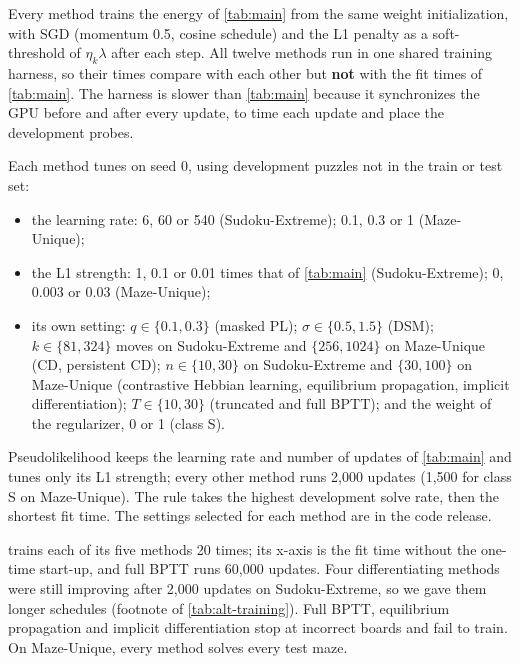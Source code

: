 \documentclass{article}
\newcommand{\BPTT}{BPTT}
\begin{document}
Every method trains the energy of \cref{tab:main} from the same weight initialization, with SGD (momentum 0.5, cosine schedule) and the L1 penalty as a soft-threshold of $\eta_k\lambda$ after each step.
All twelve methods run in one shared training harness, so their times compare with each other but \textbf{not} with the fit times of \cref{tab:main}.
The harness is slower than \cref{tab:main} because it synchronizes the GPU before and after every update, to time each update and place the development probes.

Each method tunes on seed 0, using development puzzles not in the train or test set:
\begin{itemize}
\item the learning rate: 6, 60 or 540 (Sudoku-Extreme); 0.1, 0.3 or 1 (Maze-Unique);
\item the L1 strength: 1, 0.1 or 0.01 times that of \cref{tab:main} (Sudoku-Extreme); 0, 0.003 or 0.03 (Maze-Unique);
\item its own setting: $q\in\{0.1,0.3\}$ (masked PL); $\sigma\in\{0.5,1.5\}$ (DSM); $k\in\{81,324\}$ moves on Sudoku-Extreme and $\{256,1024\}$ on Maze-Unique (CD, persistent CD); $n\in\{10,30\}$ on Sudoku-Extreme and $\{30,100\}$ on Maze-Unique (contrastive Hebbian learning, equilibrium propagation, implicit differentiation); $T\in\{10,30\}$ (truncated and full \BPTT{}); and the weight of the \citet{du2019} regularizer, 0 or 1 (class S).
\end{itemize}
Pseudolikelihood keeps the learning rate and number of updates of \cref{tab:main} and tunes only its L1 strength; every other method runs 2,000 updates (1,500 for class S on Maze-Unique).
The rule takes the highest development solve rate, then the shortest fit time.
The settings selected for each method are in the code release.

 trains each of its five methods 20 times; its x-axis is the fit time without the one-time start-up, and full \BPTT{} runs 60,000 updates.
Four differentiating methods were still improving after 2,000 updates on Sudoku-Extreme, so we gave them longer schedules (footnote of \cref{tab:alt-training}).
Full \BPTT{}, equilibrium propagation and implicit differentiation stop at incorrect boards and fail to train.
On Maze-Unique, every method solves every test maze.
\end{document}
